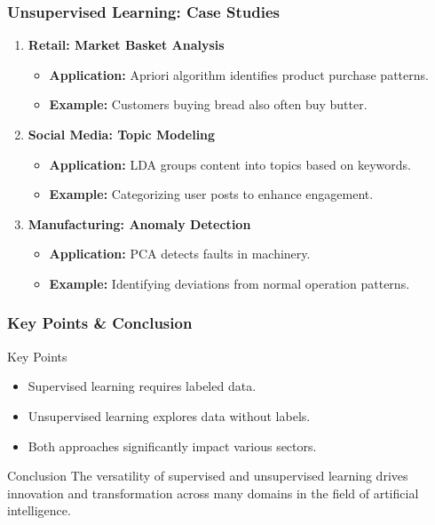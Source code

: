 \documentclass{beamer}
\begin{document}
\begin{frame}[fragile]
    \frametitle{Unsupervised Learning: Case Studies}
    \begin{enumerate}
        \item \textbf{Retail: Market Basket Analysis}
            \begin{itemize}
                \item \textbf{Application:} Apriori algorithm identifies product purchase patterns.
                \item \textbf{Example:} Customers buying bread also often buy butter.
            \end{itemize}
        
        \item \textbf{Social Media: Topic Modeling}
            \begin{itemize}
                \item \textbf{Application:} LDA groups content into topics based on keywords.
                \item \textbf{Example:} Categorizing user posts to enhance engagement.
            \end{itemize}

        \item \textbf{Manufacturing: Anomaly Detection}
            \begin{itemize}
                \item \textbf{Application:} PCA detects faults in machinery.
                \item \textbf{Example:} Identifying deviations from normal operation patterns.
            \end{itemize}
    \end{enumerate}
\end{frame}

\begin{frame}[fragile]
    \frametitle{Key Points & Conclusion}
    \begin{block}{Key Points}
        \begin{itemize}
            \item Supervised learning requires labeled data.
            \item Unsupervised learning explores data without labels.
            \item Both approaches significantly impact various sectors.
        \end{itemize}
    \end{block}

    \begin{block}{Conclusion}
        The versatility of supervised and unsupervised learning drives innovation and transformation across many domains in the field of artificial intelligence.
    \end{block}
\end{frame}
\end{document}
